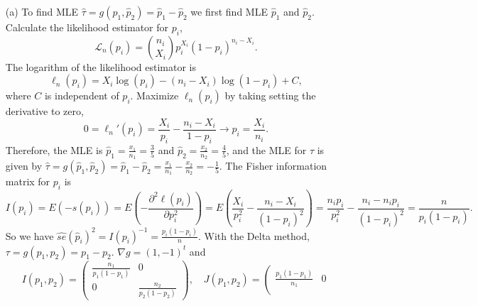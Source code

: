 \begin{itemize}
    \item[(a)] To find MLE $\hat{\tau} = g(\hat{p}_1, \hat{p}_2) = \hat{p}_1 - \hat{p}_2$ we first find MLE $\hat{p}_1$ and $\hat{p}_2$.
        Calculate the likelihood estimator for $p_i$,
        \begin{equation*}
            \mathcal{L}_n(p_i) = \binom{n_i}{X_i} p_i^{X_i} (1 - p_i)^{n_i - X_i}.
        \end{equation*}
        The logarithm of the likelihood estimator is
        \begin{equation*}
            \ell_n(p_i) = X_i \log(p_i) - (n_i - X_i) \log(1 - p_i) + C,
        \end{equation*}
        where $C$ is independent of $p_i$.
        Maximize $\ell_n(p_i)$ by taking setting the derivative to zero,
        \begin{equation*}
            0 = \ell_n'(p_i) = \frac{X_i}{p_i} - \frac{n_i - X_i}{1 - p_i} \rightarrow p_i = \frac{X_i}{n_i}.
        \end{equation*}
        Therefore, the MLE is $\hat{p}_1 = \frac{x_1}{n_1} = \frac{3}{5}$ and $\hat{p}_2 = \frac{x_2}{n_2} = \frac{4}{5}$, and the MLE for $\tau$ is given by $\hat{\tau} = g(\hat{p}_1, \hat{p}_2) = \hat{p}_1 - \hat{p}_2 = \frac{x_1}{n_1} - \frac{x_2}{n_2} = -\frac{1}{5}$.
        The Fisher information matrix for $p_i$ is
        \begin{equation*}
            I(p_i) = E(-s(p_i))
                = E\left(-\frac{\partial^2 \ell(p_i)}{\partial p_i^2}\right)
                = E\left(\frac{X_i}{p_i^2} - \frac{n_i - X_i}{(1 - p_i)^2}\right)
                = \frac{n_i p_i}{p_i^2} - \frac{n_i - n_i p_i}{(1 - p_i)^2}
                = \frac{n}{p_i(1 - p_i)}.
        \end{equation*}
        So we have $\hat{se}(\hat{p}_i)^2 = I(p_i)^{-1} = \frac{p_i(1 - p_i)}{n}$.
        With the Delta method, $\tau = g(p_1, p_2) = p_1 - p_2$.
        $\nabla g = (1, -1)^t$ and
        \begin{equation*}
            I(p_1, p_2) = \left( \begin{matrix}
                \frac{n_1}{p_1 (1 - p_1)} & 0 \\
                0 & \frac{n_2}{p_2 (1 - p_2)}
            \end{matrix} \right),
            \quad
            J(p_1, p_2) = \left( \begin{matrix}
                \frac{p_1 (1 - p_1)}{n_1} & 0 \\

\end{matrix}
\end{equation*}
\end{itemize}
